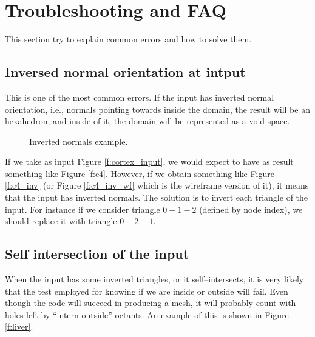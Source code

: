 \documentclass[10pt]{article}
\begin{document}
\section{Troubleshooting and FAQ}
\label{problems}


This section try to explain common errors and how to solve them.

\subsection{Inversed normal orientation at intput}

This is one of the most common errors. If the input has inverted normal orientation, i.e., normals pointing towards inside the domain, the result will be an hexahedron, and inside of it, the domain will be represented as a void space.

 \begin{figure}[htb]
\centering
\caption{Inverted normals example.}
\label{f:inverted_example}
\end{figure}


If we take as input Figure \ref{f:cortex_input}, we would expect to have as result something like Figure \ref{f:c4}. However, if we obtain something like Figure \ref{f:c4_inv} (or Figure \ref{f:c4_inv_wf} which is the wireframe version of it), it means that the input has inverted normals. The solution is to invert each triangle of the input. For instance if we consider triangle $0-1-2$ (defined by node index), we should replace it with triangle $0-2-1$.


\subsection{Self intersection of the input}

When the input has some inverted triangles, or it self--intersects, it is very likely that the test employed for knowing if we are inside or outside will fail. Even though the code will succeed in producing a mesh, it will probably count with holes left by ``intern outside'' octants. An example of this is shown in Figure \ref{f:liver}.
\end{document}
